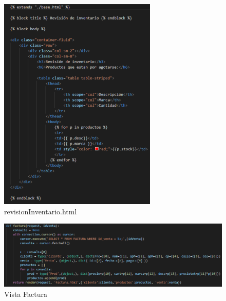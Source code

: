\documentclass[12pt,letterpaper]{article}
\begin{document}
	\begin{figure}[H]
		\centering
		\includegraphics[scale=0.70]{Documentacion/img/lineasRevision.png}
		\caption{revisionInventario.html}
	\end{figure}
	
	\begin{figure}[H]
		\centering
		\includegraphics[scale=0.50]{Documentacion/img/def_Factura.png}
		\caption{Vista Factura}
	\end{figure}
	
\end{document}
